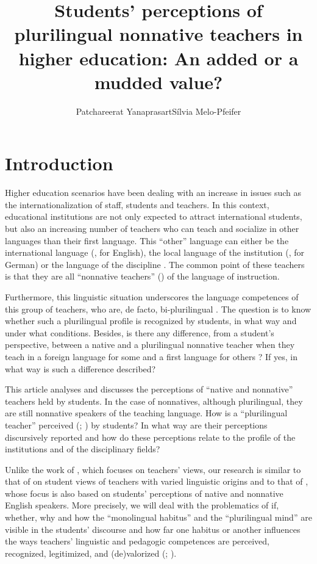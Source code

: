 \documentclass[output=paper]{../langscibook}
\author{Patchareerat Yanaprasart\affiliation{University of Geneva}\lastand Sílvia Melo-Pfeifer \affiliation{University of Hamburg}}
\title{Students’ perceptions of plurilingual nonnative teachers in higher education: An added or a mudded value?}
\begin{document}
\maketitle
{}%




\section{Introduction}

Higher education scenarios have been dealing with an increase in issues such as the internationalization of staff, students and teachers. In this context, educational institutions are not only expected to attract international students, but also an increasing number of teachers who can teach and socialize in other languages than their first language. This “other” language can either be the international language (\citealt{Mueller2018}, for English), the local language of the institution (\citealt{Melo-Pfeifer2017}, for German) or the language of the discipline \citep{Yanaprasart2019}. The common point of these teachers is that they are all “nonnative teachers” (\citealt{DervinBadrinathan2011}) of the language of instruction.

Furthermore, this linguistic situation underscores the language competences of this group of teachers, who are, de facto, bi-plurilingual \citep{Mueller2018}. The question is to know whether such a plurilingual profile is recognized by students, in what way and under what conditions. Besides, is there any difference, from a student’s perspective, between a native and a plurilingual nonnative teacher when they teach in a foreign language for some and a first language for others \citep{Taillefer2004}? If yes, in what way is such a difference described? 

This article analyses and discusses the perceptions of “native and nonnative” teachers held by students. In the case of nonnatives, although plurilingual, they are still nonnative speakers of the teaching language. How is a “plurilingual teacher” perceived (\citealt{Llurda2005}; \citealt{VargheseEtAl2005}) by students? In what way are their perceptions discursively reported \citep{Miller2010} and how do these perceptions relate to the profile of the institutions and of the disciplinary fields?

Unlike the work of \citet{Medgyes1992,Medgyes1994}, which focuses on teachers’ views, our research is similar to that of \citet{LiChuaChenVanTienNguyen2011} on student views of teachers with varied linguistic origins and to that of \citet{LasagabasterSierra2002}, whose focus is also based on students’ perceptions of native and nonnative English speakers. More precisely, we will deal with the problematics of if, whether, why and how the “monolingual habitus” \citep{Gogolin2008} and the “plurilingual mind” \citep{Menghini2017} are visible in the students’ discourse and how far one habitus or another influences the ways teachers’ linguistic and pedagogic competences are perceived, recognized, legitimized, and (de)valorized (\citealt{Kramsch1997}; \citealt{ClarkParan2007}).
\end{document}

